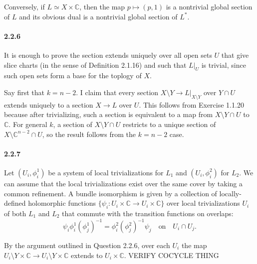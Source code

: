 \documentclass[10pt,letter]{article}
\begin{document}
Conversely, if $L \simeq X \times \mathbb{C}$, then the map $p \mapsto (p,1)$ is a nontrivial global section of $L$ and its obvious dual is a nontrivial global section of $L^{\ast}$. 

\paragraph*{2.2.6} It is enough to prove the section extends uniquely over all open sets $U$ that give slice charts (in the sense of Definition 2.1.16) and such that $L\vert_U$ is trivial, since such open sets form a base for the toplogy of $X$. 

Say first that $k = n-2$. I claim that every section $X \setminus Y \rightarrow L\vert_{X\setminus Y}$ over $Y \cap U$ extends uniquely to a section $X \rightarrow L$ over $U$. This follows from Exercise 1.1.20 because after trivializing, such a section is equivalent to a map from $X \setminus Y \cap U$ to $\mathbb{C}$. For general $k$, a section of $X \setminus Y \cap U$ restricts to a unique section of $X\setminus \mathbb{C}^{n-2} \cap U$, so the result follows from the $k = n-2$ case. 


\paragraph*{2.2.7} Let $(U_i,\phi^1_i)$ be a system of local trivializations for $L_1$ and $(U_i, \phi^2_i)$ for $L_2$. We can assume that the local trivializations exist over the same cover by taking a common refinement. A bundle isomorphism is given by a collection of locally-defined holomorphic functions $\lbrace \psi_i: U_i \times \mathbb{C} \rightarrow U_i \times \mathbb{C} \rbrace$ over local trivializations $U_i$ of both $L_1$ and $L_2$ that commute with the transition functions on overlaps:
\[ \psi_i \phi_i^1 (\phi_j^1)^{-1} = \phi_i^2 (\phi_j^2)^{-1} \psi_j \ \ \ \text{ on } \ \ \ U_i \cap U_j.\] 

By the argument outlined in Question 2.2.6, over each $U_i$ the map $U_i \setminus Y \times \mathbb{C} \rightarrow U_i \setminus Y \times \mathbb{C}$ extends to $U_i \times \mathbb{C}$. VERIFY COCYCLE THING
\end{document}
